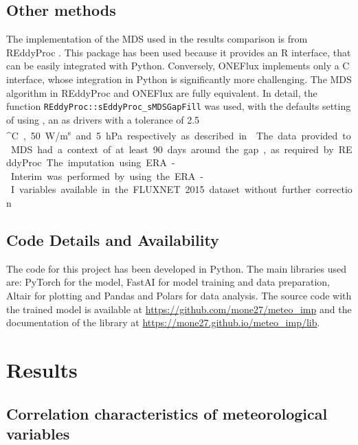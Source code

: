\documentclass{article}
\let\Oldsection\section
\renewcommand{\section}{\FloatBarrier\Oldsection}
\let\Oldsubsection\subsection
\renewcommand{\subsection}{\FloatBarrier\Oldsubsection}
\begin{document}
\subsection{Other methods}

The implementation of the MDS used in the results comparison is from \textsf{REddyProc} \cite{wutzler_basic_2018}. This package has been used because it provides an R interface, that can be easily integrated with Python. Conversely, \textsf{ONEFlux} implements only a C interface, whose integration in Python is significantly more challenging.  The MDS algorithm in \textsf{REddyProc} and \textsf{ONEFlux} are fully equivalent. In detail, the function \verb|REddyProc::sEddyProc_sMDSGapFill| was used, with the defaults setting of using ,  an  as drivers with a tolerance of 2.5 \si{^\circ C}, 50 \si{W/m^s} and 5 \si{hPa} respectively as described in \textcite{reichstein_separation_2005-3}.
The data provided to MDS had a context of at least 90 days around the gap, as required by \textsf{REddyProc}. 

The imputation using ERA-Interim was performed by using the ERA-I variables available in the FLUXNET 2015 dataset without further correction.

\subsection{Code Details and Availability}

The code for this project has been developed in Python. The main libraries used are: \textsf{PyTorch} \cite{NEURIPS2019_9015} for the model,  \textsf{FastAI} \cite{howard_fastai_2020} for model training and data preparation, \textsf{Altair} \cite{VanderPlas2018,Satyanarayan2017} for plotting and \textsf{Pandas} and \textsf{Polars} for data analysis. The source code with the trained model is available at \url{https://github.com/mone27/meteo_imp} and the documentation of the library at \url{https://mone27.github.io/meteo_imp/lib}.

\section{Results}

\subsection{Correlation characteristics of meteorological variables}
\end{document}
